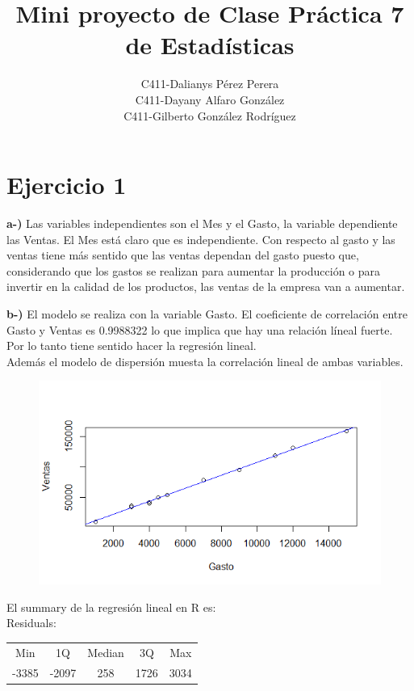 \documentclass[12pt,a4paper]{article}
\author{
	C411-Dalianys Pérez Perera\\C411-Dayany Alfaro González\\C411-Gilberto González Rodríguez
}
\date{}
\title{Mini proyecto de Clase Práctica 7 de Estadísticas}
\begin{document}
	\maketitle
	\section{Ejercicio 1}
	\textbf{a-)} Las variables independientes son el Mes y el Gasto, la variable dependiente las Ventas. El Mes está claro que es independiente. Con respecto al gasto y las ventas tiene más sentido que las ventas dependan del gasto puesto que, considerando que los gastos se realizan para aumentar la producción o para invertir en la calidad de los productos, las ventas de la empresa van a aumentar.
	
	\textbf{b-)} El modelo se realiza con la variable Gasto. El coeficiente de correlación entre Gasto y Ventas es 0.9988322 lo que implica que hay una relación líneal fuerte. Por lo tanto tiene sentido hacer la regresión lineal.\\
	Además el modelo de dispersión muesta la correlación lineal de ambas variables.\\
	\begin{figure}[h!]
		\centering
		\includegraphics[scale=0.8]{GxV.png}
	\end{figure}
	
	\newpage
	
	El summary de la regresión lineal en R es:\\
	
	Residuals:\\

	\begin{tabular}{ccccc}
		Min&     1Q& Median&     3Q&    Max\\
		-3385&  -2097&    258&   1726&   3034 
	\end{tabular}\\ 
	
\end{document}

